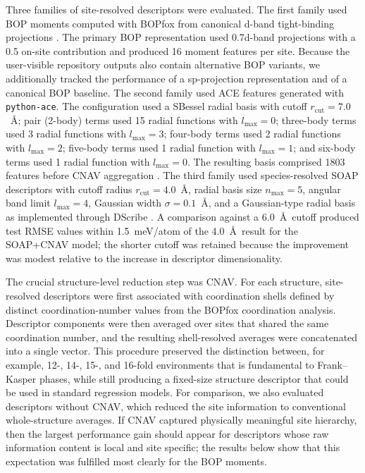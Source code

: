 \documentclass[prb,twocolumn,floatfix]{revtex4-2}
\begin{document}
Three families of site-resolved descriptors were evaluated. The first family used BOP moments computed with BOPfox from canonical d-band tight-binding projections \cite{Pettifor1995,Hammerschmidt2019BOPfox}. The primary BOP representation used 0.7d-band projections with a 0.5 on-site contribution and produced 16 moment features per site. Because the user-visible repository outputs also contain alternative BOP variants, we additionally tracked the performance of a sp-projection representation and of a canonical BOP baseline. The second family used ACE features generated with \texttt{python-ace}. The configuration used a SBessel radial basis with cutoff $r_{\mathrm{cut}}=7.0$~\AA; pair (2-body) terms used 15 radial functions with $l_{\max}=0$; three-body terms used 3 radial functions with $l_{\max}=3$; four-body terms used 2 radial functions with $l_{\max}=2$; five-body terms used 1 radial function with $l_{\max}=1$; and six-body terms used 1 radial function with $l_{\max}=0$. The resulting basis comprised 1803 features before CNAV aggregation \cite{Drautz2019ACE}. The third family used species-resolved SOAP descriptors with cutoff radius $r_{\mathrm{cut}}=4.0$~\AA, radial basis size $n_{\max}=5$, angular band limit $l_{\max}=4$, Gaussian width $\sigma=0.1$~\AA, and a Gaussian-type radial basis as implemented through DScribe \cite{Bartok2013SOAP,Himanen2020DScribe}. A comparison against a 6.0~\AA\ cutoff produced test RMSE values within 1.5~meV/atom of the 4.0~\AA\ result for the SOAP+CNAV model; the shorter cutoff was retained because the improvement was modest relative to the increase in descriptor dimensionality.

The crucial structure-level reduction step was CNAV. For each structure, site-resolved descriptors were first associated with coordination shells defined by distinct coordination-number values from the BOPfox coordination analysis. Descriptor components were then averaged over sites that shared the same coordination number, and the resulting shell-resolved averages were concatenated into a single vector. This procedure preserved the distinction between, for example, 12-, 14-, 15-, and 16-fold environments that is fundamental to Frank--Kasper phases, while still producing a fixed-size structure descriptor that could be used in standard regression models. For comparison, we also evaluated descriptors without CNAV, which reduced the site information to conventional whole-structure averages. If CNAV captured physically meaningful site hierarchy, then the largest performance gain should appear for descriptors whose raw information content is local and site specific; the results below show that this expectation was fulfilled most clearly for the BOP moments.
\end{document}

